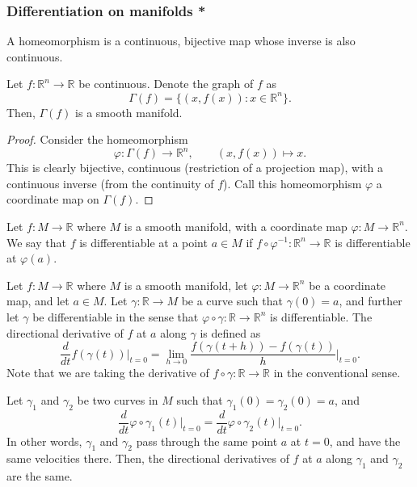 \documentclass[11pt]{article}
\newcommand{\R}{\mathbb{R}}
\newcommand{\dd}[2]{\frac{d #1}{d #2}}
\theoremstyle{definition}
\theoremstyle{remark}
\numberwithin{equation}{section}
\begin{document}
    \subsubsection{Differentiation on manifolds *}

    \begin{definition}
        A homeomorphism is a continuous, bijective map whose inverse is also continuous.
    \end{definition}

    \begin{lemma}
        Let $f\colon \R^n \to \R$ be continuous. Denote the graph of $f$ as \[
            \Gamma(f) = \{(x, f(x)): x \in \R^n\}.
        \] Then, $\Gamma(f)$ is a smooth manifold.
    \end{lemma}
    \begin{proof}
        Consider the homeomorphism \[
            \varphi\colon \Gamma(f) \to \R^n, \qquad (x, f(x)) \mapsto x.
        \] This is clearly bijective, continuous (restriction of a projection map),
        with a continuous inverse (from the continuity of $f$). Call this
        homeomorphism $\varphi$ a coordinate map on $\Gamma(f)$.
    \end{proof}

    \begin{definition}
        Let $f\colon M \to \R$ where $M$ is a smooth manifold, with a coordinate map
        $\varphi\colon M \to \R^n$. We say that $f$ is differentiable at a point $a
        \in M$ if $f\circ \varphi^{-1}\colon \R^n \to \R$ is differentiable at
        $\varphi(a)$.
    \end{definition}

    \begin{definition}
        Let $f\colon M \to \R$ where $M$ is a smooth manifold, let $\varphi\colon M
        \to \R^n$ be a coordinate map, and let $a \in M$. Let $\gamma\colon \R \to M$
        be a curve such that $\gamma(0) = a$, and further let $\gamma$ be
        differentiable in the sense that $\varphi\circ \gamma\colon \R \to \R^n$ is
        differentiable. The directional derivative of $f$ at $a$ along $\gamma$ is
        defined as \[
            \dd{}{t} f(\gamma(t))\Big|_{t = 0} = \lim_{h \to 0} \frac{f(\gamma(t +
            h)) - f(\gamma(t))}{h}\Big|_{t = 0}.
        \] Note that we are taking the derivative of $f\circ \gamma\colon \R \to \R$
        in the conventional sense.
    \end{definition}

    \begin{lemma}
        Let $\gamma_1$ and $\gamma_2$ be two curves in $M$ such that $\gamma_1(0) =
        \gamma_2(0) = a$, and \[
            \dd{}{t} \varphi\circ \gamma_1(t)\Big|_{t = 0} = \dd{}{t} \varphi\circ
            \gamma_2(t)\Big|_{t = 0}.
        \] In other words, $\gamma_1$ and $\gamma_2$ pass through the same point $a$
        at $t = 0$, and have the same velocities there. Then, the directional
        derivatives of $f$ at $a$ along $\gamma_1$ and $\gamma_2$ are the same.
    \end{lemma}
\end{document}
